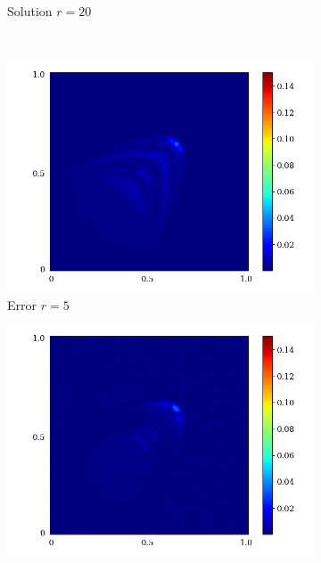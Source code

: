\begin{figure}[ht!]
\begin{center}
\begin{subfigure}[b]{0.20\textwidth}
\begin{center}
            \end{center}
            \caption{Solution $r = 20$}
        \end{subfigure}\\  
        \begin{subfigure}[b]{0.20\textwidth}
            \begin{center}
                \includegraphics[trim = {0, 0, 3cm, 0}, clip, width=\textwidth]{Pictures/X-rom-NE-DAE-5-abs-err.png}
            \end{center}
            \caption{Error $r = 5$}
        \end{subfigure}  
        \begin{subfigure}[b]{0.20\textwidth}
            \begin{center}
                \includegraphics[trim = {0, 0, 3cm, 0}, clip, width=\textwidth]{Pictures/X-rom-NE-DAE-10-abs-err.png}

\end{center}
\end{subfigure}
\end{center}
\end{figure}
